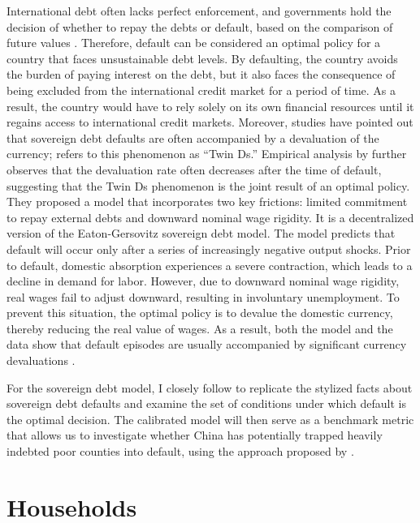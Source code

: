 International debt often lacks perfect enforcement, and governments hold the decision of whether to repay the debts or default, based on the comparison of future values \citep*{Eaton-Gersovitz-81}. Therefore, default can be considered an optimal policy for a country that faces unsustainable debt levels. By defaulting, the country avoids the burden of paying interest on the debt, but it also faces the consequence of being excluded from the international credit market for a period of time. As a result, the country would have to rely solely on its own financial resources until it regains access to international credit markets.
Moreover, studies have pointed out that sovereign debt defaults are often accompanied by a devaluation of the currency; \citet*{Reinhart02} refers to this phenomenon as ``Twin Ds.''
Empirical analysis by \citet*{Na-18} further observes that the devaluation rate often decreases after the time of default, suggesting that the Twin Ds phenomenon is the joint result of an optimal policy.
They proposed a model that incorporates two key frictions: limited commitment to repay external debts and downward nominal wage rigidity.
It is a decentralized version of the Eaton-Gersovitz sovereign debt model.
The model predicts that default will occur only after a series of increasingly negative output shocks. Prior to default, domestic absorption experiences a severe contraction, which leads to a decline in demand for labor. However, due to downward nominal wage rigidity, real wages fail to adjust downward, resulting in involuntary unemployment. To prevent this situation, the optimal policy is to devalue the domestic currency, thereby reducing the real value of wages. As a result, both the model and the data show that default episodes are usually accompanied by significant currency devaluations \citep*{Na-18}.

For the sovereign debt model, I closely follow \citet*{Na-18} to replicate the stylized facts about sovereign debt defaults and examine the set of conditions under which default is the optimal decision.
The calibrated model will then serve as a benchmark metric that allows us to investigate whether China has potentially trapped heavily indebted poor counties into default, using the approach proposed by \citet*{Hinrichsen_2020-chapter4}.

\section{Households}


